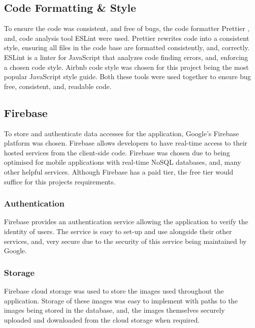 \subsection{Code Formatting \& Style} \label{CodeF&S}
To ensure the code was consistent, and free of bugs, the code formatter Prettier \cite{prettier}, and, code analysis tool ESLint \cite{eslint} were used. Prettier rewrites code into a consistent style, ensuring all files in the code base are formatted consistently, and, correctly. ESLint is a linter for JavaScript that analyzes code finding errors, and, enforcing a chosen code style. Airbnb \cite{airbnb} code style was chosen for this project being the most popular JavaScript style guide. Both these tools were used together to ensure bug free, consistent, and, readable code. 
\subsection{Firebase}\label{firebaseSection}
To store and authenticate data accesses for the application, Google's Firebase \cite{firebase} platform was chosen. Firebase allows developers to have real-time access to their hosted services from the client-side code. Firebase was chosen due to being optimised for mobile applications with real-time NoSQL \cite{nosql} databases, and, many other helpful services. Although Firebase has a paid tier, the free tier would suffice for this projects requirements.     
\subsubsection{Authentication}
Firebase provides an authentication service allowing the application to verify the identity of users. The service is easy to set-up and use alongside their other services, and, very secure due to the security of this service being maintained by Google.
\subsubsection{Storage}
Firebase cloud storage was used to store the images used throughout the application. Storage of these images was easy to implement with paths to the images being stored in the database, and, the images themselves securely uploaded and downloaded from the cloud storage when required.
